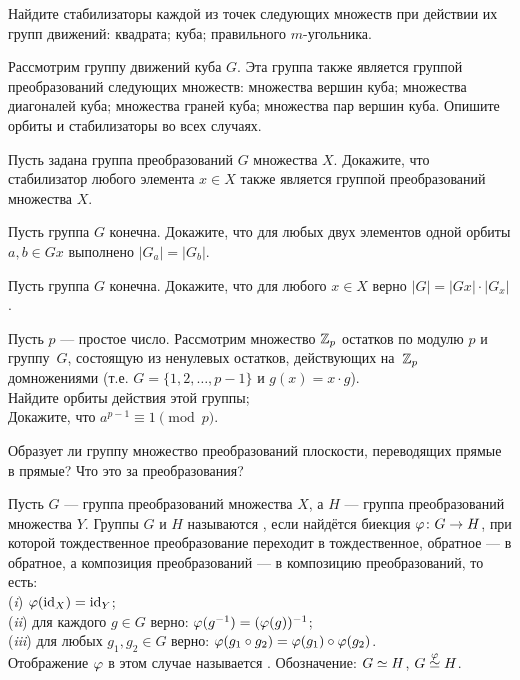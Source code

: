 \documentclass[a4paper,12pt]{article}
\begin{document}
Найдите стабилизаторы каждой из точек следующих множеств при действии их групп движений:
квадрата;
куба;
правильного $m$-угольника.

Рассмотрим группу движений куба $G$. Эта группа также является группой преобразований следующих множеств:
 множества вершин куба;
 множества диагоналей куба;
 множества граней куба;
 множества пар вершин куба.
Опишите орбиты и стабилизаторы во всех случаях.

Пусть задана группа преобразований $G$ множества $X$. Докажите, что стабилизатор
любого элемента $x\in X$ также является группой преобразований множества $X$.

Пусть группа $G$ конечна. Докажите, что для любых двух элементов одной орбиты $a,b \in Gx$ выполнено $|G_a| = |G_b|$.

Пусть группа $G$ конечна. Докажите, что для любого $x \in X$ верно $|G| = |Gx| \cdot |G_x|$.

Пусть $p$ --- простое число.
Рассмотрим множество $\mathbb{Z}_p$ остатков по модулю $p$ и группу~$G$, состоящую из ненулевых остатков, действующих на~$\mathbb{Z}_p$ домножениями (т.е. $G=\{1, 2,\ldots,p-1\}$ и $g(x) = x\cdot g$).
\\ Найдите орбиты действия этой группы;
\\ Докажите, что $a^{p-1} \equiv 1 \pmod{p}$.



Образует ли группу множество преобразований плоскости, переводящих прямые в прямые? Что это за преобразования?


\newpage
{}
\label{homo}
Пусть $G$ --- группа преобразований множества $X$, а $H$ --- группа преобразований множества $Y$. Группы $G$ и $H$ называются , если найдётся биекция $\varphi \colon G \rightarrow H$, при которой тождественное преобразование переходит в тождественное, обратное --- в обратное, а композиция преобразований --- в композицию преобразований, то есть:\\
(\emph{i}\/) $\varphi(\operatorname{id}_X) = \operatorname{id}_Y$;\\
(\emph{ii}\/) для каждого $g \in G$ верно: $\varphi(g^{-1}) = (\varphi(g))^{-1}$;\\
(\emph{iii}\/) для любых $g_1,g_2\in G$ верно: $\varphi(g_1\circ g_2)=\varphi(g_1)\circ\varphi(g_2)$.\\
Отображение $\varphi$ в этом случае называется .
 Обозначение: $G\simeq H$, $G\stackrel{\varphi}{\simeq} H$.
\end{document}
